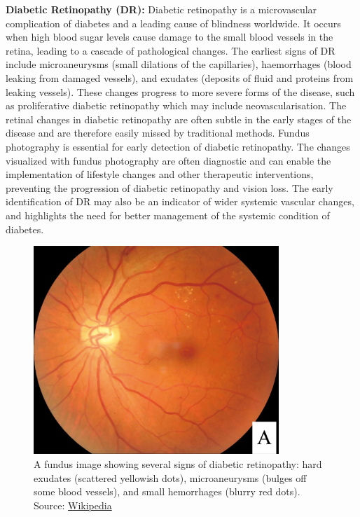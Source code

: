 \documentclass[
  Letterpaper,
]{scrbook}
\begin{document}
\textbf{Diabetic Retinopathy (DR):} Diabetic retinopathy is a
microvascular complication of diabetes and a leading cause of blindness
worldwide. It occurs when high blood sugar levels cause damage to the
small blood vessels in the retina, leading to a cascade of pathological
changes. The earliest signs of DR include microaneurysms (small
dilations of the capillaries), haemorrhages (blood leaking from damaged
vessels), and exudates (deposits of fluid and proteins from leaking
vessels). These changes progress to more severe forms of the disease,
such as proliferative diabetic retinopathy which may include
neovascularisation. The retinal changes in diabetic retinopathy are
often subtle in the early stages of the disease and are therefore easily
missed by traditional methods. Fundus photography is essential for early
detection of diabetic retinopathy. The changes visualized with fundus
photography are often diagnostic and can enable the implementation of
lifestyle changes and other therapeutic interventions, preventing the
progression of diabetic retinopathy and vision loss. The early
identification of DR may also be an indicator of wider systemic vascular
changes, and highlights the need for better management of the systemic
condition of diabetes.

\begin{figure}[H]

{\centering \includegraphics[width=3.64583in,height=\textheight,keepaspectratio]{_resources/images/pathologies/Fundus_-_diabetic_retinopathy.png}

}

\caption{A fundus image showing several signs of diabetic retinopathy:
hard exudates (scattered yellowish dots), microaneurysms (bulges off
some blood vessels), and small hemorrhages (blurry red dots).\\
Source:
\href{https://en.wikipedia.org/wiki/Diabetic_retinopathy}{Wikipedia}}

\end{figure}%
\end{document}
